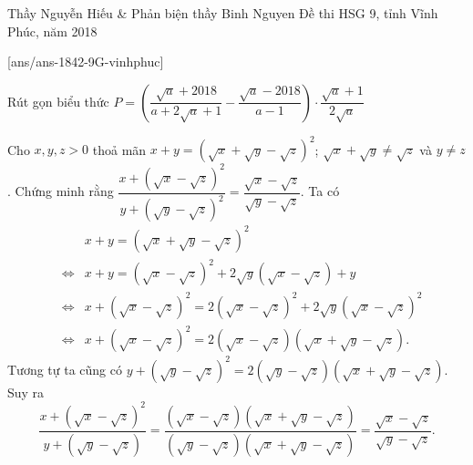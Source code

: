 \begin{name}
{Thầy  Nguyễn Hiếu \& Phản biện thầy Binh Nguyen}
{Đề thi HSG 9, tỉnh Vĩnh Phúc, năm 2018}
\end{name}
\setcounter{ex}{0}
[ans/ans-1842-9G-vinhphuc]
\begin{ex}%
	Rút gọn biểu thức $P=\left(\dfrac{\sqrt{a}+2018}{a+2\sqrt{a}+1}-\dfrac{\sqrt{a}-2018}{a-1}\right)\cdot\dfrac{\sqrt{a}+1}{2\sqrt{a}}$
\end{ex}

\begin{ex}%
    Cho $x,y,z>0$ thoả mãn $x+y=\left(\sqrt{x}+\sqrt{y}-\sqrt{z}\right)^2$; $\sqrt{x}+\sqrt{y}\neq \sqrt{z}$ và $y\neq z$. Chứng minh rằng
$\dfrac{x+\left(\sqrt{x}-\sqrt{z}\right)^2}{y+\left(\sqrt{y}-\sqrt{z}\right)^2}=\dfrac{\sqrt{x}-\sqrt{z}}{\sqrt{y}-\sqrt{z}}$.
\loigiai
    {
    Ta có 
	\begin{eqnarray*}
	&&x+y=\left(\sqrt{x}+\sqrt{y}-\sqrt{z}\right)^2\\
	&\Leftrightarrow& x+y=\left(\sqrt{x}-\sqrt{z}\right)^2+2\sqrt{y}\left(\sqrt{x}-\sqrt{z}\right)+y\\
	&\Leftrightarrow & x+\left(\sqrt{x}-\sqrt{z}\right)^2=2\left(\sqrt{x}-\sqrt{z}\right)^2+2\sqrt{y}\left(\sqrt{x}-\sqrt{z}\right)^2\\
	&\Leftrightarrow & x+\left(\sqrt{x}-\sqrt{z}\right)^2 =2\left(\sqrt{x}-\sqrt{z}\right)\left(\sqrt{x}+\sqrt{y}-\sqrt{z}\right).
	\end{eqnarray*}	   
	Tương tự ta cũng có $y+\left(\sqrt{y}-\sqrt{z}\right)^2=2\left(\sqrt{y}-\sqrt{z}\right)\left(\sqrt{x}+\sqrt{y}-\sqrt{z}\right)$.\\
Suy ra 
$$\dfrac{x+\left(\sqrt{x}-\sqrt{z}\right)^2}{y+\left(\sqrt{y}-\sqrt{z}\right)}=\dfrac{\left(\sqrt{x}-\sqrt{z}\right)\left(\sqrt{x}+\sqrt{y}-\sqrt{z}\right)}{\left(\sqrt{y}-\sqrt{z}\right)\left(\sqrt{x}+\sqrt{y}-\sqrt{z}\right)}=\dfrac{\sqrt{x}-\sqrt{z}}{\sqrt{y}-\sqrt{z}}.$$
    }
\end{ex}

